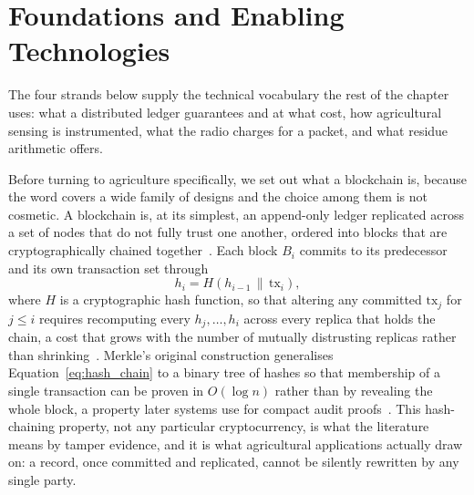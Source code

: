 \documentclass[12pt,a4paper,oneside]{book}
\begin{document}
\section{Foundations and Enabling Technologies}
\label{sec:lit_foundations}

The four strands below supply the technical vocabulary the rest of the
chapter uses: what a distributed ledger guarantees and at what cost, how
agricultural sensing is instrumented, what the radio charges for a packet,
and what residue arithmetic offers.

\label{subsec:lit_fundamentals}

Before turning to agriculture specifically, we set out what a blockchain
is, because the word covers a wide family of designs and the choice among
them is not cosmetic. A blockchain is, at its simplest, an
append-only ledger replicated across a set of nodes that do not
fully trust one another, ordered into blocks that are cryptographically
chained together~\cite{christidis2016blockchain, debruyne2022trust}. Each
block $B_i$ commits to its predecessor and its own transaction set through
\begin{equation}
h_i = H\!\left( h_{i-1} \,\|\, \mathrm{tx}_i \right),
\label{eq:hash_chain}
\end{equation}
where $H$ is a cryptographic hash function, so that altering any committed
$\mathrm{tx}_j$ for $j \le i$ requires recomputing every $h_j,\ldots,h_i$
across every replica that holds the chain, a cost that grows with the
number of mutually distrusting replicas rather than
shrinking~\cite{fernandez2024iotTamper}. Merkle's original construction
generalises Equation~\ref{eq:hash_chain} to a binary tree of hashes so that
membership of a single transaction can be proven in $O(\log n)$ rather than
by revealing the whole block, a property later systems use for compact
audit proofs~\cite{sharma2018merkle}. This hash-chaining property, not any
particular cryptocurrency, is what the literature means by tamper evidence,
and it is what agricultural applications actually draw on: a record, once
committed and replicated, cannot be silently rewritten by any single party.
\end{document}
